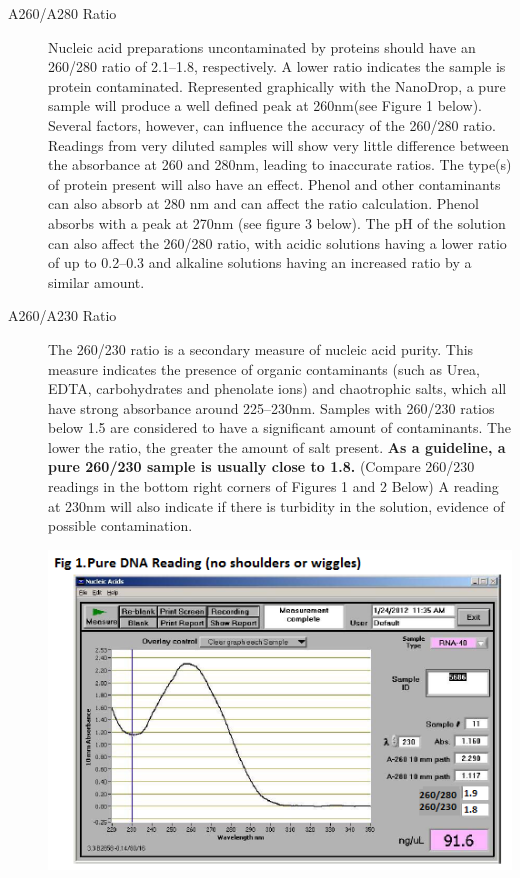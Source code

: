 \documentclass[12pt]{../SOP3_alpha}\usepackage[]{graphicx}\usepackage[]{color}
\begin{document}
\begin{description}
  \item[A260/A280 Ratio] Nucleic acid preparations uncontaminated by proteins should have an 260/280 ratio of 2.1--1.8, respectively. A lower ratio indicates the sample is protein contaminated. Represented graphically with the NanoDrop, a pure sample will produce a well defined peak at 260nm(see Figure 1 below). Several factors, however, can influence the accuracy of the 260/280 ratio. Readings from very diluted samples will show very little difference between the absorbance at 260 and 280nm, leading to inaccurate ratios.  The type(s) of protein present will also have an effect. Phenol and other contaminants can also absorb at 280 nm and can affect the ratio calculation. Phenol absorbs with a peak at 270nm (see figure 3 below). The pH of the solution can also affect the 260/280 ratio, with acidic solutions having a lower ratio of up to 0.2--0.3 and alkaline solutions having an increased ratio by a similar amount.
  
  \item[A260/A230 Ratio] The 260/230 ratio is a secondary measure of nucleic acid purity. This measure indicates the presence of organic contaminants (such as Urea, EDTA, carbohydrates and phenolate ions) and chaotrophic salts, which all have strong absorbance around 225--230nm. Samples with 260/230 ratios below 1.5 are considered to have a significant amount of contaminants. The lower the ratio, the greater the amount of salt present. \textbf{As a guideline, a pure 260/230 sample is usually close to 1.8.} (Compare 260/230 readings in the bottom right corners of Figures 1 and 2 Below)  A reading at 230nm will also indicate if there is turbidity in the solution, evidence of possible contamination.  
  
\includegraphics[scale=1]{NanoDropPure.png}


\end{description}
\end{document}
